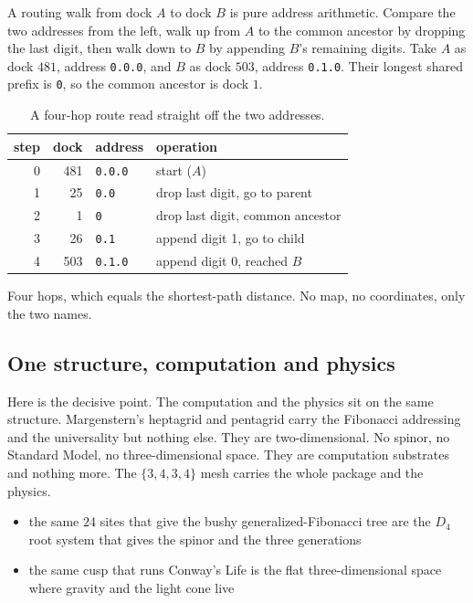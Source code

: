 A routing walk from dock $A$ to dock $B$ is pure address arithmetic. Compare the two addresses from the left, walk up from $A$ to the common ancestor by dropping the last digit, then walk down to $B$ by appending $B$'s remaining digits. Take $A$ as dock $481$, address \texttt{0.0.0}, and $B$ as dock $503$, address \texttt{0.1.0}. Their longest shared prefix is \texttt{0}, so the common ancestor is dock $1$.

\begin{table}[ht]
\centering
\begin{tabular}{@{}rrll@{}}
\toprule
step & dock & address & operation \\
\midrule
0 & 481 & \texttt{0.0.0} & start ($A$) \\
1 & 25 & \texttt{0.0} & drop last digit, go to parent \\
2 & 1 & \texttt{0} & drop last digit, common ancestor \\
3 & 26 & \texttt{0.1} & append digit 1, go to child \\
4 & 503 & \texttt{0.1.0} & append digit 0, reached $B$ \\
\bottomrule
\end{tabular}
\caption{A four-hop route read straight off the two addresses.}
\label{tab:route-walk}
\end{table}

Four hops, which equals the shortest-path distance. No map, no coordinates, only the two names.

\subsection{One structure, computation and physics}

Here is the decisive point. The computation and the physics sit on the same structure. Margenstern's heptagrid and pentagrid carry the Fibonacci addressing and the universality but nothing else. They are two-dimensional. No spinor, no Standard Model, no three-dimensional space. They are computation substrates and nothing more. The $\{3,4,3,4\}$ mesh carries the whole package and the physics.

\begin{itemize}
\item the same $24$ sites that give the bushy generalized-Fibonacci tree are the $D_4$ root system that gives the spinor and the three generations
\item the same cusp that runs Conway's Life is the flat three-dimensional space where gravity and the light cone live
\end{itemize}

